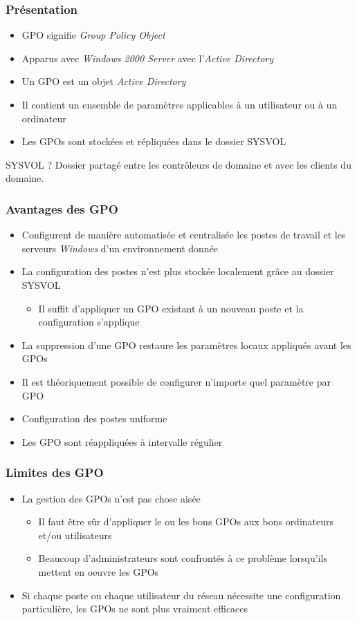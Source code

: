 \documentclass{beamer}
\begin{document}
  \begin{frame}
   \frametitle{Présentation}
   \begin{itemize}
    \item GPO signifie \textit{Group Policy Object}
    \item Apparus avec \textit{Windows 2000 Server} avec l'\textit{Active Directory}
    \item Un GPO est un objet \textit{Active Directory}
    \item Il contient un ensemble de paramètres applicables à un utilisateur ou à un ordinateur
    \item Les GPOs sont stockées et répliquées dans le dossier SYSVOL
   \end{itemize}
   \begin{block}{SYSVOL ?}
    Dossier partagé entre les contrôleurs de domaine et avec les clients du domaine.
   \end{block}

  \end{frame}

  \begin{frame}
   \frametitle{Avantages des GPO}
   \begin{itemize}
    \item Configurent de manière automatisée et centralisée les postes de travail et les serveurs \textit{Windows} d'un environnement donnée
    \item La configuration des postes n'est plus stockée localement grâce au dossier SYSVOL
    \begin{itemize}
     \item Il suffit d'appliquer un GPO existant à un nouveau poste et la configuration s'applique
    \end{itemize}
    \item La suppression d'une GPO restaure les paramètres locaux appliqués avant les GPOs
    \item Il est théoriquement possible de configurer n'importe quel paramètre par GPO
    \item Configuration des postes uniforme
    \item Les GPO sont réappliquées à intervalle régulier
   \end{itemize}
  \end{frame}
  
  \begin{frame}
   \frametitle{Limites des GPO}
   \begin{itemize}
    \item La gestion des GPOs n'est pas chose aisée
    \begin{itemize}
      \item Il faut être sûr d'appliquer le ou les bons GPOs aux bons ordinateurs et/ou utilisateurs
      \item Beaucoup d'administrateurs sont confrontés à ce problème lorsqu'ils mettent en oeuvre les GPOs
    \end{itemize}
    \item Si chaque poste ou chaque utilisateur du réseau nécessite une configuration particulière, les GPOs ne sont plus vraiment efficaces
   \end{itemize}
  \end{frame}
\end{document}

